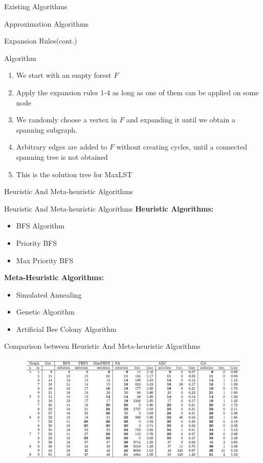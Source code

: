 \documentclass[xcolor=svgnames]{beamer}
\begin{document}
\begin{section}{Existing Algorithms}
\begin{subsection}{Approximation Algorithms}
\begin{frame}{Expansion Rules(cont.)}
        \end{frame} 
        \begin{frame}{Algorithm}
            \begin{enumerate}
                \item We start with an empty forest $F$
                \item Apply the expansion rules 1-4 as long as one of them can be applied on some node
                \item We randomly choose a vertex in $F$ and expanding it until we obtain a spanning subgraph.
                \item Arbitrary edges are added to $F$ without creating cycles, until a connected spanning tree is not obtained
                \item This is the solution tree for MaxLST
            \end{enumerate}
        \end{frame}
    \end{subsection}
    \begin{subsection}{Heuristic And Meta-heuristic Algorithms}
        \begin{frame}{Heuristic And Meta-heuristic Algorithms}
            \textcolor{mqdeepred}{\textbf{\large Heuristic Algorithms:}}
            \begin{itemize}
                \item BFS Algorithm
                \item Priority BFS
                \item Max Priority BFS
            \end{itemize}
            \textcolor{mqdeepred}{\textbf{\large Meta-Heuristic Algorithms:}}
            \begin{itemize}
                \item Simulated Annealing
                \item Genetic Algorithm
                \item Artificial Bee Colony Algorithm
            \end{itemize}
        \end{frame}
        \begin{frame}{Comparison between Heuristic And Meta-heuristic Algorithms}
            \begin{figure}
                \centering
                \includegraphics[width=\linewidth]{exp.png}

\end{figure}
\end{frame}
\end{subsection}
\end{section}
\end{document}
